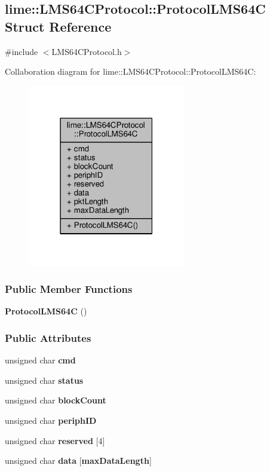 \subsection{lime\+:\+:L\+M\+S64\+C\+Protocol\+:\+:Protocol\+L\+M\+S64C Struct Reference}
\label{structlime_1_1LMS64CProtocol_1_1ProtocolLMS64C}


{\ttfamily \#include $<$L\+M\+S64\+C\+Protocol.\+h$>$}



Collaboration diagram for lime\+:\+:L\+M\+S64\+C\+Protocol\+:\+:Protocol\+L\+M\+S64C\+:
\nopagebreak
\begin{figure}[H]
\begin{center}
\leavevmode
\includegraphics[width=195pt]{d5/d9f/structlime_1_1LMS64CProtocol_1_1ProtocolLMS64C__coll__graph}
\end{center}
\end{figure}
\subsubsection*{Public Member Functions}
\begin{DoxyCompactItemize}
\item 
{\bf Protocol\+L\+M\+S64C} ()
\end{DoxyCompactItemize}
\subsubsection*{Public Attributes}
\begin{DoxyCompactItemize}
\item 
unsigned char {\bf cmd}
\item 
unsigned char {\bf status}
\item 
unsigned char {\bf block\+Count}
\item 
unsigned char {\bf periph\+ID}
\item 
unsigned char {\bf reserved} [4]
\item 
unsigned char {\bf data} [{\bf max\+Data\+Length}]
\end{DoxyCompactItemize}
